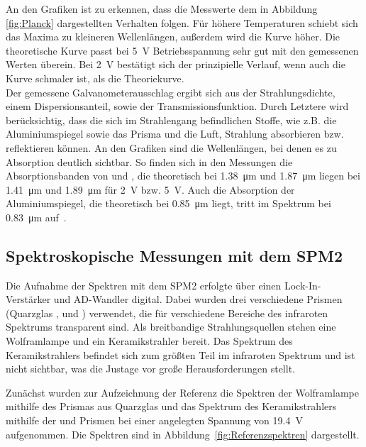 \documentclass[a4paper,twoside,final]{article}
\begin{document}
\FloatBarrier
An den Grafiken ist zu erkennen, dass die Messwerte dem in Abbildung \ref{fig:Planck} dargestellten Verhalten folgen. Für höhere Temperaturen schiebt sich das Maxima zu kleineren Wellenlängen, außerdem wird die Kurve höher. Die theoretische Kurve passt bei \SI{5}{\volt} Betriebsspannung sehr gut mit den gemessenen Werten überein. Bei \SI{2}{\volt} bestätigt sich der prinzipielle Verlauf, wenn auch die Kurve schmaler ist, als die Theoriekurve.\\
Der gemessene Galvanometerausschlag ergibt sich aus der Strahlungsdichte, einem Dispersionsanteil, sowie der Transmissionsfunktion. Durch Letztere wird berücksichtig, dass die sich im Strahlengang befindlichen Stoffe, wie z.B. die Aluminiumspiegel sowie das Prisma und die Luft, Strahlung absorbieren bzw. reflektieren können. An den Grafiken sind die Wellenlängen, bei denen es zu Absorption deutlich sichtbar. So finden sich in den Messungen die Absorptionsbanden von  und , die theoretisch bei \SI{1.38}{\micro\meter} und \SI{1.87}{\micro\meter} liegen bei \SI{1.41}{\micro\meter} und \SI{1.89}{\micro\meter} für \SI{2}{\volt} bzw. \SI{5}{\volt}. Auch die Absorption der Aluminiumspiegel, die theoretisch bei \SI{0.85}{\micro\meter} liegt, tritt im Spektrum bei \SI{0.83}{\micro\meter} auf~\cite{Mutschke}.

\subsection{Spektroskopische Messungen mit dem SPM2}

Die Aufnahme der Spektren mit dem SPM2 erfolgte über einen Lock-In-Verstärker und AD-Wandler digital. Dabei wurden drei verschiedene Prismen (Quarzglas ,  und ) verwendet, die für verschiedene Bereiche des infraroten Spektrums transparent sind. Als breitbandige Strahlungsquellen stehen eine Wolframlampe und ein Keramikstrahler bereit. Das Spektrum des Keramikstrahlers befindet sich zum größten Teil im infraroten Spektrum und ist nicht sichtbar, was die Justage vor große Herausforderungen stellt.

Zunächst wurden zur Aufzeichnung der Referenz die Spektren der Wolframlampe mithilfe des Prismas aus Quarzglas und das Spektrum des Keramikstrahlers mithilfe der  und  Prismen bei einer angelegten Spannung von \SI{19.4}{\volt} aufgenommen. Die Spektren sind in Abbildung~\ref{fig:Referenzspektren} dargestellt.


\end{document}
